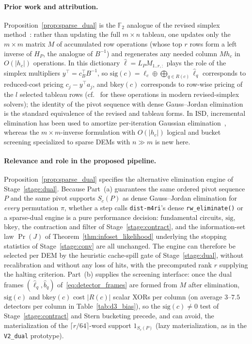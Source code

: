 \documentclass[12pt]{article}
\theoremstyle{definition}
\newcommand{\Ftwo}{\mathbb{F}_2}
\newcommand{\ttt}[1]{\texttt{#1}}
\begin{document}
\paragraph{Prior work and attribution.}
Proposition~\ref{prop:sparse_dual} is the $\Ftwo$ analogue of the revised simplex
method~\cite{Dantzig1953RM1266,DantzigOrchardHays1954}: rather than updating the full $m \times n$ tableau, one
updates only the $m \times m$ matrix $M$ of accumulated row operations (whose top $r$ rows form a left inverse of
$H_P$, the analogue of $B^{-1}$) and regenerates any needed column $M h_c$ in $O(|h_c|)$ operations. In this
dictionary $\hat{\ell} = L_P M_{1..r,:}$ plays the role of the simplex multipliers $y^\top = c_B^\top B^{-1}$, so
$\mathrm{sig}(c) = \ell_c \oplus \bigoplus_{q \in R(c)} \hat{\ell}_q$ corresponds to reduced-cost pricing $c_j -
y^\top a_j$, and $\mathrm{bkey}(c)$ corresponds to row-wise pricing of the $l$ selected tableau rows
(cf.~\cite{HuangfuHall2018} for these operations in modern revised-simplex solvers); the identity of the pivot
sequence with dense Gauss--Jordan elimination is the standard equivalence of the revised and tableau forms. In ISD,
incremental elimination has been used to amortize per-iteration Gaussian
elimination~\cite{CanteautChabaud1998,BernsteinLangePeters2008}, whereas the $m \times m$-inverse formulation with
$O(|h_c|)$ logical and bucket screening specialized to sparse DEMs with $n \gg m$ is new here.

\paragraph{Relevance and role in the proposed pipeline.}
Proposition~\ref{prop:sparse_dual} specifies the alternative elimination engine of Stage~\ref{stage:dual}. Because
Part~(a) guarantees the same ordered pivot sequence $P$ and the same pivot supports $S_c(P)$ as dense Gauss--Jordan
elimination for \emph{every} permutation $\pi$, whether a step calls \ttt{dist-m4ri}'s dense \ttt{rw\_eliminate()} or
a sparse-dual engine is a pure performance decision: fundamental circuits, $\mathrm{sig}$, $\mathrm{bkey}$, the
contraction and filter of Stage~\ref{stage:contract}, and the information-set law $\Pr(J)$ of
Theorem~\ref{thm:infoset_likelihood} underlying the stopping statistics of Stage~\ref{stage:conv} are all unchanged.
The engine can therefore be selected per DEM by the heuristic cache-spill gate of Stage~\ref{stage:dual}, without
recalibration and without any loss of hits, with the precomputed rank $r$ supplying the halting criterion. Part~(b)
supplies the screening interface: once the dual frames $(\hat{\ell}_q, \hat{b}_q)$ of~\eqref{eq:detector_frames} are
formed from $M$ after elimination, $\mathrm{sig}(c)$ and $\mathrm{bkey}(c)$ cost $|R(c)|$ scalar XORs per column (on
average $3$--$7.5$ detectors per column in Table~\ref{tab:d3_bias}), so the $\mathrm{sig}(c) \neq 0$ test of
Stage~\ref{stage:contract} and Stern bucketing precede, and can avoid, the materialization of the $\lceil r/64
\rceil$-word support $1_{S_c(P)}$ (lazy materialization, as in the \ttt{V2\_dual} prototype).
\end{document}

